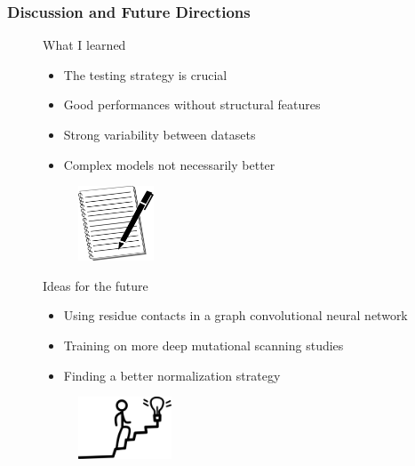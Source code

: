 \documentclass[10pt, british, luatex]{beamer}
\begin{document}
\begin{frame}
	\frametitle{Discussion and Future Directions}
	\begin{figure}
		\begin{minipage}{.6\textwidth}%
			{%
				\Large%
				What I learned
			}
			\vspace{1ex}
			\begin{itemize}
				\item The testing strategy is crucial
				\item Good performances without structural features
				\item Strong variability between datasets
				\item Complex models not necessarily better
			\end{itemize}
		\end{minipage}%
		\begin{minipage}{.4\textwidth}%
			\vspace{1em}
			\begin{figure}
				\includegraphics[height=6em]{images/notes.pdf}
			\end{figure}
		\end{minipage}
		\vfill%
		\begin{minipage}{.6\textwidth}%
			{%
				\Large%
				Ideas for the future
			}
			\vspace{1ex}
			\begin{itemize}
				\item Using residue contacts in a graph convolutional neural network
				\item Training on more deep mutational scanning studies
				\item Finding a better normalization strategy
			\end{itemize}
		\end{minipage}%
		\begin{minipage}{.4\textwidth}%
			\vspace{1em}
			\begin{figure}
				\includegraphics[height=5em]{images/hell-birne-karriere-klettern-licht.pdf}
			\end{figure}
		\end{minipage}%
		\vspace{3em}
	\end{figure}
\end{frame}
\end{document}
